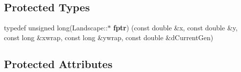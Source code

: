 \subsection*{Protected Types}
\begin{DoxyCompactItemize}
\item 
typedef unsigned long(Landscape\+::$\ast$ {\bfseries fptr}) (const double \&x, const double \&y, const long \&xwrap, const long \&ywrap, const double \&d\+Current\+Gen)\hypertarget{class_landscape_a0458438a91632e19343e3cf8c2d994f1}{}\label{class_landscape_a0458438a91632e19343e3cf8c2d994f1}

\end{DoxyCompactItemize}
\subsection*{Protected Attributes}
